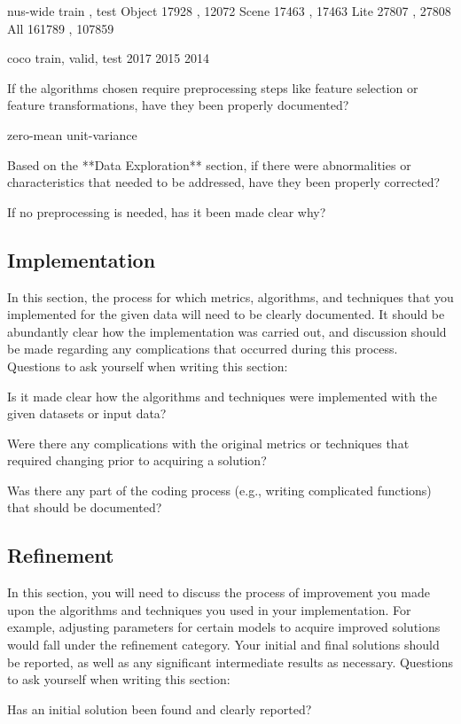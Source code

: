 \documentclass[12pt,journal,compsoc]{IEEEtran}
\begin{document}
nus-wide
         train ,   test
Object   17928 ,  12072
Scene    17463 ,  17463
Lite     27807 ,  27808
All     161789 , 107859

coco
        train, valid, test
2017
2015
2014

If the algorithms chosen require preprocessing steps like feature selection or feature transformations, have they been properly documented?

zero-mean unit-variance

Based on the **Data Exploration** section, if there were abnormalities or characteristics that needed to be addressed, have they been properly corrected?

If no preprocessing is needed, has it been made clear why?


\subsection{Implementation}
In this section, the process for which metrics, algorithms, and techniques that you implemented for the given data will need to be clearly documented. It should be abundantly clear how the implementation was carried out, and discussion should be made regarding any complications that occurred during this process. Questions to ask yourself when writing this section:

Is it made clear how the algorithms and techniques were implemented with the given datasets or input data?

Were there any complications with the original metrics or techniques that required changing prior to acquiring a solution?

Was there any part of the coding process (e.g., writing complicated functions) that should be documented?


\subsection{Refinement}
In this section, you will need to discuss the process of improvement you made upon the algorithms and techniques you used in your implementation. For example, adjusting parameters for certain models to acquire improved solutions would fall under the refinement category. Your initial and final solutions should be reported, as well as any significant intermediate results as necessary. Questions to ask yourself when writing this section:

Has an initial solution been found and clearly reported?
\end{document}

